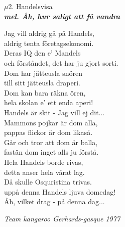 \documentclass[a6paper,10pt]{article}
\newcommand{\mel}[1]{\small\textbf{\textit{mel. #1 \\}}}
\begin{document}
\setlength{\oddsidemargin}{-0.47in}
\noindent
\begin{center}
\Large $\mu$2. Handelsvisa\\
\mel{Åh, hur saligt att få vandra}
\end{center}
Jag vill aldrig gå på Handels,\\
aldrig tenta företagsekonomi.\\
Deras IQ den e' Mandels\\
och förståndet, det har ju gjort sorti.\\
Dom har jätteusla snören\\
till sitt jätteusla draperi.\\
Dom kan bara räkna ören,\\
hela skolan e' ett enda aperi!
\vspace{5pt}\\
Handels är skit - Jag vill ej dit...
\vspace{5pt}\\
Mammons pojkar är dom alla,\\
pappas flickor är dom likaså.\\
Går och tror att dom är balla,\\
fastän dom inget alls ju förstå.\\
Hela Handels borde rivas,\\
detta anser hela vårat lag.\\
Då skulle Osquristina trivas.\\
uppå denna Handels ljuva domedag!
\vspace{5pt}\\
Åh, vilket drag - på denna dag... 
\begin{flushright}
\textit{Team kangaroo Gerhards-gasque 1977}
\end{flushright}
\end{document}
